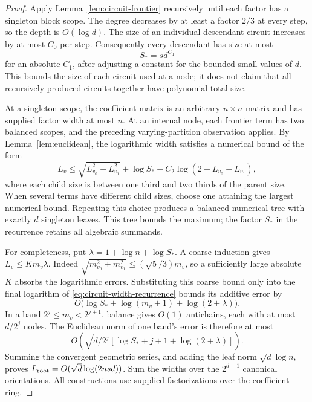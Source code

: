 \documentclass[11pt]{article}
\theoremstyle{definition}
\theoremstyle{remark}
\begin{document}
\begin{proof}
Apply Lemma~\ref{lem:circuit-frontier} recursively until each
factor has a singleton block scope.  The degree decreases by at
least a factor $2/3$ at every step, so the depth is $O(\log d)$.
The size of an individual descendant circuit increases by at most
$C_0$ per step.  Consequently every descendant has size at most
\[
 S_* = s d^{C_1}
\]
for an absolute $C_1$, after adjusting a constant for the bounded
small values of $d$.  This bounds the size of each circuit used
at a node; it does not claim that all recursively produced circuits
together have polynomial total size.

At a singleton scope, the coefficient matrix is an arbitrary
$n\times n$ matrix and has supplied factor width at most $n$.
At an internal node, each frontier term has two balanced scopes,
and the preceding varying-partition observation applies.  By
Lemma~\ref{lem:euclidean}, the logarithmic width satisfies a
numerical bound of the form
\begin{equation}
\label{eq:circuit-width-recurrence}
 L_v\le\sqrt{L_{v_0}^2+L_{v_1}^2}
       +\log S_*+C_2\log(2+L_{v_0}+L_{v_1}),
\end{equation}
where each child size is between one third and two thirds of the
parent size.  When several terms have different child sizes, choose
one attaining the largest numerical bound.  Repeating this choice
produces a balanced numerical tree with exactly $d$ singleton
leaves.  This tree bounds the maximum; the factor $S_*$ in the
recurrence retains all algebraic summands.

For completeness, put $\lambda=1+\log n+\log S_*$.  A coarse
induction gives $L_v\le K m_v\lambda$.  Indeed
$\sqrt{m_{v_0}^2+m_{v_1}^2}\le(\sqrt5/3)m_v$, so a sufficiently
large absolute $K$ absorbs the logarithmic errors.  Substituting
this coarse bound only into the final logarithm of
\eqref{eq:circuit-width-recurrence} bounds its additive error by
\[
 O\bigl(\log S_*+\log(m_v+1)+\log(2+\lambda)\bigr).
\]
In a band $2^j\le m_v<2^{j+1}$, balance gives $O(1)$ antichains,
each with at most $d/2^j$ nodes.  The Euclidean norm of one band's
error is therefore at most
\[
 O\!\left(\sqrt{d/2^j}
       [\log S_*+j+1+\log(2+\lambda)]\right).
\]
Summing the convergent geometric series, and adding the leaf norm
$\sqrt d\log n$, proves
$L_{\rm root}=O(\sqrt d\log(2nsd))$.  Sum the widths over the
$2^{d-1}$ canonical orientations.  All constructions use supplied
factorizations over the coefficient ring.
\end{proof}
\end{document}
